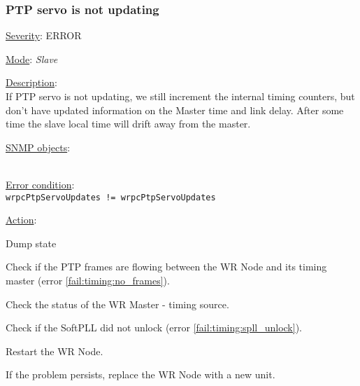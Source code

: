 \subsubsection{\bf PTP servo is not updating}
		\label{fail:timing:servo_not_updating}
		\begin{pck_descr}
			\item [] \underline{Severity}: ERROR
			\item [] \underline{Mode}: \emph{Slave}
			\item [] \underline{Description}:\\
				If PTP servo is not updating, we still increment the internal timing
				counters, but don't have updated information on the Master time and link
				delay. After some time the slave local time will drift away from the
				master.
			\item [] \underline{SNMP objects}:\\
				{\footnotesize
				\\
				 }
			\item [] \underline{Error condition}:\\
				{\footnotesize
				\texttt{wrpcPtpServoUpdates != wrpcPtpServoUpdates} }
      \item [] \underline{Action}:
        \begin{pck_proc}
        \item Dump state
        \item Check if the PTP frames are flowing between the WR Node and its
          timing master (error \ref{fail:timing:no_frames}).
        \item Check the status of the WR Master - timing source.
        \item Check if the SoftPLL did not unlock (error
          \ref{fail:timing:spll_unlock}).
        \item Restart the WR Node.
        \item If the problem persists, replace the WR Node with a new unit.
        \end{pck_proc}
		\end{pck_descr}

